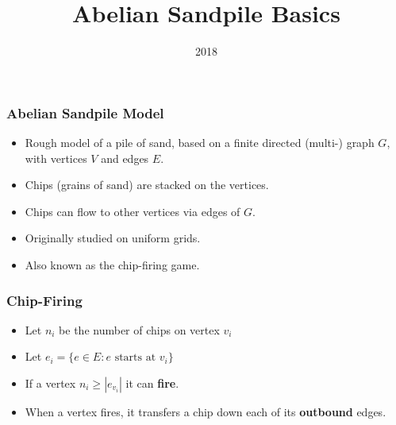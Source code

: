 \documentclass{beamer}
\title{Abelian Sandpile Basics}
\date{2018}
\begin{document}
\frame{\titlepage}

\begin{frame}
\frametitle{Abelian Sandpile Model}
\begin{itemize}
\item Rough model of a pile of sand, based on a finite directed (multi-) graph $G$, with vertices $V$ and edges $E$.

\item Chips (grains of sand) are stacked on the vertices.

\item Chips can flow to other vertices via edges of $G$.

\item Originally studied on uniform grids.

\item Also known as the chip-firing game.
\end{itemize}
\end{frame}

\begin{frame}
\frametitle{Chip-Firing}
\begin{itemize}
\item Let $n_i$ be the number of chips on vertex $v_i$
\item Let $e_{i} = \{e \in E : e \mbox{ starts at } v_i\}$

\item If a vertex $n_i \geq |e_{v_i}|$ it can \textbf{fire}.

\item When a vertex fires, it transfers a chip down each of its \textbf{outbound} edges.
\end{itemize}


\end{frame}
\end{document}
